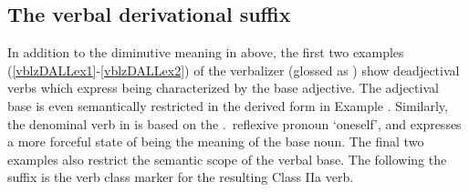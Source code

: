 \subsection{The verbal derivational suffix }\label{vblzDALL}
In addition to the diminutive meaning in  above, 
the first two examples \mbox{(\ref{vblzDALLex1}-\ref{vblzDALLex2})} of the verbalizer  (glossed as ) show deadjectival verbs which express being characterized by the base adjective. The adjectival base is even semantically restricted in the derived form in Example . 
Similarly, the denominal verb in  is based on the \SGs.\NOMs\ reflexive pronoun  ‘oneself’, and expresses a more forceful state of being the meaning of the base noun. The final two examples also restrict the semantic scope of the verbal base. 
The  following the  suffix is the verb class marker for the resulting Class IIa verb. 
\ea\label{vblzDALLex1}
\z
\ea\label{vblzDALLex2}
\z
\ea\label{vblzDALLex3}
\z
\ea\label{vblzDALLex4}
\z
\ea\label{vblzDALLex5}
\z






